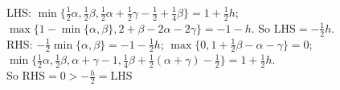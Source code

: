\documentclass[11pt]{article}
\begin{document}
\begin{enumerate}
        LHS: $\min\{\frac{1}{2}\alpha,\frac{1}{2}\beta,\frac{1}{2}\alpha+\frac{1}{2}\gamma-\frac{1}{2}+\frac{1}{4}\beta\}=1+\frac{1}{2}h$; $\max\{1-\min\{\alpha,\beta\},2+\beta-2\alpha-2\gamma\}=-1-h$. So $\mbox{LHS}=-\frac{1}{2}h$.\\
        RHS: $-\frac{1}{2}\min\{\alpha,\beta\}=-1-\frac{1}{2}h$; $\max\{0,1+\frac{1}{2}\beta-\alpha-\gamma\}=0$; $\min\{\frac{1}{2}\alpha,\frac{1}{2}\beta,\alpha+\gamma-1,\frac{1}{4}\beta+\frac{1}{2}(\alpha+\gamma)-\frac{1}{2}\}=1+\frac{1}{2}h$. \\
        So $\mbox{RHS}=0>-\frac{h}{2}=\mbox{LHS}$
    \end{enumerate}



\vskip 0.2in
\end{document}
